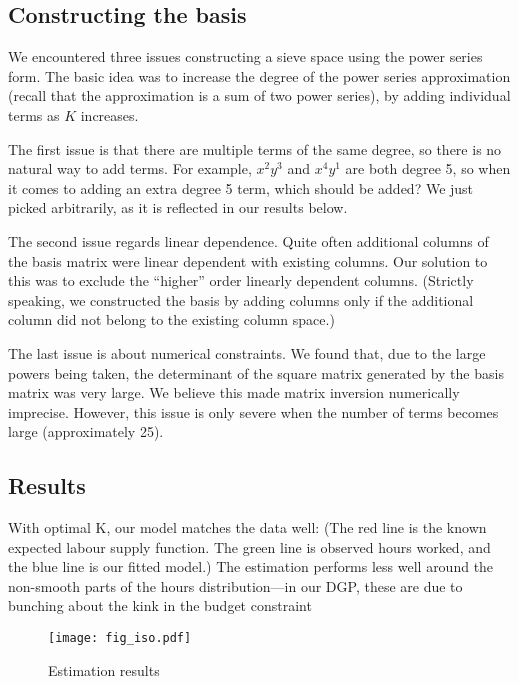 \documentclass[11pt,letterpaper]{article}                  %
\begin{document}
\subsection{Constructing the basis}

We encountered three issues constructing a sieve space using the power series form.
The basic idea was to increase the degree of the power series approximation (recall that the approximation is a sum of two power series), by adding individual terms as $K$ increases.

The first issue is that there are multiple terms of the same degree, so there is no natural way to add terms.
For example, $x^2y^3$ and $x^4y^1$ are both degree 5, so when it comes to adding an extra degree 5 term, which should be added?
We just picked arbitrarily, as it is reflected in our results below.

The second issue regards linear dependence.
Quite often additional columns of the basis matrix were linear dependent with existing columns.
Our solution to this was to exclude the ``higher'' order linearly dependent columns.
(Strictly speaking, we constructed the basis by adding columns only if the additional column did not belong to the existing column space.)

The last issue is about numerical constraints.
We found that, due to the large powers being taken, the determinant of the square matrix generated by the basis matrix was very large.
We believe this made matrix inversion numerically imprecise.
However, this issue is only severe when the number of terms becomes large (approximately 25).



\subsection{Results}
\label{sec:ex1}

With optimal K, our model matches the data well: (The red line is the known expected labour supply function. The green
line is observed hours worked, and the blue line is our fitted model.)
 The estimation performs less well
around the non-smooth parts of the hours distribution---in our DGP,
these are due to bunching about the kink in the budget constraint
\begin{figure}[H]
	\centering
	\caption{Estimation results}
	\label{fig:est1}
	\texttt{[image: fig\_iso.pdf]}
\end{figure}
\end{document}
